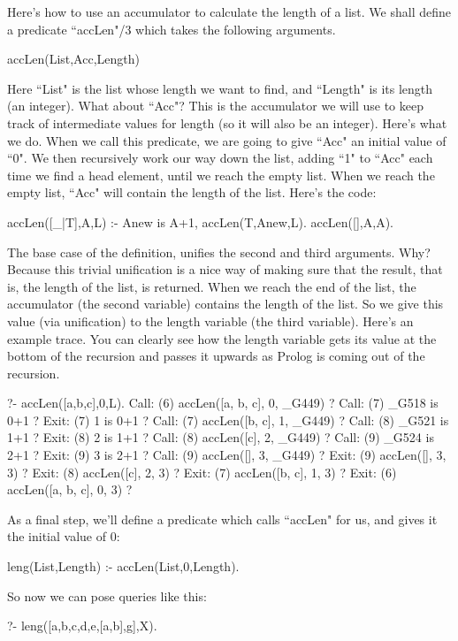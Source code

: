 Here's how to use an accumulator to calculate the length of a list.
We shall define a predicate ``accLen"/3 which takes the following
arguments.
\begin{LPNcodedisplay}
accLen(List,Acc,Length)
\end{LPNcodedisplay}
Here ``List" is the list whose length we want to find, and ``Length" is
its length (an integer).  What about ``Acc"?  This is the accumulator
we will use to keep track of intermediate values for length (so it
will also be an integer).  Here's what we do.  When we call this
predicate, we are going to give ``Acc" an initial value of ``0".  We
then recursively work our way down the list, adding ``1" to ``Acc" each
time we find a head element, until we reach the empty list.  When we
reach the empty list, ``Acc" will contain the length of the list.
Here's the code:
\begin{LPNcodedisplay}
accLen([_|T],A,L) :-  Anew is A+1, accLen(T,Anew,L).
accLen([],A,A).
\end{LPNcodedisplay}

The base case of the definition, unifies the second and third
arguments.  Why?  Because this trivial unification is a nice way of
making sure that the result, that is, the length of the list, is
returned. When we reach the end of the list, the accumulator (the
second variable) contains the length of the list.  So we give this
value (via unification) to the length variable (the third variable).
Here's an example trace. You can clearly see how the length variable
gets its value at the bottom of the recursion and passes it upwards as
Prolog is coming out of the recursion.
\begin{LPNcodedisplay}
?- accLen([a,b,c],0,L).
   Call: (6) accLen([a, b, c], 0, _G449) ?
   Call: (7) _G518 is 0+1 ?
   Exit: (7) 1 is 0+1 ?
   Call: (7) accLen([b, c], 1, _G449) ?
   Call: (8) _G521 is 1+1 ?
   Exit: (8) 2 is 1+1 ?
   Call: (8) accLen([c], 2, _G449) ?
   Call: (9) _G524 is 2+1 ?
   Exit: (9) 3 is 2+1 ?
   Call: (9) accLen([], 3, _G449) ?
   Exit: (9) accLen([], 3, 3) ?
   Exit: (8) accLen([c], 2, 3) ?
   Exit: (7) accLen([b, c], 1, 3) ?
   Exit: (6) accLen([a, b, c], 0, 3) ?
\end{LPNcodedisplay}

As a final step, we'll define a predicate which calls ``accLen"
for us, and gives it the initial value of 0:
\begin{LPNcodedisplay}
leng(List,Length) :- accLen(List,0,Length).
\end{LPNcodedisplay}
So now we can pose queries like this:
\begin{LPNcodedisplay}
?- leng([a,b,c,d,e,[a,b],g],X).
\end{LPNcodedisplay}


